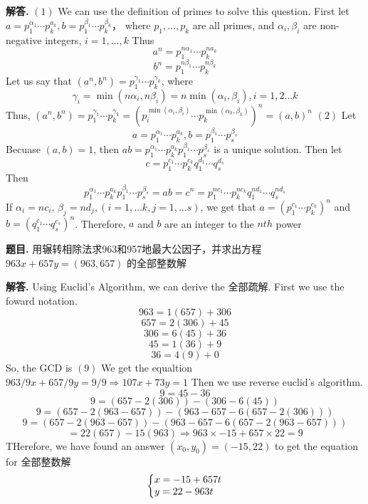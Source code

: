 \documentclass[12pt, a4paper, oneside]{article}
\newcounter{problemname}
\newenvironment{problem}{\begin{shaded}\stepcounter{problemname}\par\noindent\textbf{题目\arabic{problemname}. }}{\end{shaded}\par}
\newenvironment{solution}{\par\noindent\textbf{解答. }}{\par}
\begin{document}
\begin{CJK}{UTF8}{gbsn}
\begin{solution}
    \newline
    $(1)$ We can use the definition of primes to solve this question. First let
    $a = p_1^{\alpha_1}\cdots p_k^{a_k}, b=p_1^{\beta_1} \cdots p_k^{\beta_k} $， where $p_1,\dots,p_k$ are all primes, and 
    $\alpha_i, \beta_i$ are non-negative integers, $i = 1, \dots, k$
    Thus 
    $$ a^n =  p_1^{n\alpha_1}\cdots p_k^{na_k} $$
    $$ b^n=p_1^{n\beta_1} \cdots p_k^{n\beta_k} $$
    Let us say that $(a^n, b^n) = p_1^{\gamma_1}\cdots p_k^{\gamma_k} $, where
    $$ \gamma_i = \min{(n\alpha_i, n\beta_i)} = n\min{(\alpha_i, \beta_i)}, i = 1, 2\dots k $$
    Thus, $(a^n, b^n) = p_1^{\gamma_1}\cdots p_k^{\gamma_k} = (p_i^{\min{(\alpha_i, \beta_i)}}\cdots p_k^{\min{(\alpha_k, \beta_k)}})^n = (a,b)^n$
    \newline
    $(2)$ Let  
    $$a = p_1^{\alpha_1}\cdots p_k^{a_k}, b=p_1^{\beta_1} \cdots p_s^{\beta_s} $$
    Becuase $(a,b) = 1$, then $ab = p_1^{\alpha_1}\cdots p_k^{a_k}p_1^{\beta_1} \cdots p_s^{\beta_s}$ is a unique solution. Then let 
    $$ c = p_1^{c_1}\cdots p_k^{c_k}q_1^{d_1}\cdots q_s^{d_s} $$
    Then
    $$ p_1^{\alpha_1}\cdots p_k^{a_k}p_1^{\beta_1} \cdots p_s^{\beta_s} = ab = c^n = p_1^{nc_1}\cdots p_k^{nc_k}q_1^{nd_1}\cdots q_s^{nd_s}  $$
    If $\alpha_i = nc_i$, $\beta_j = nd_j, (i = 1, \dots k, j=1, \dots s)$, we get that $a=(p_1^{c_1} \cdots p_k^{c_k})^n$ and $b=(q_1^{c_1} \cdots q_s^{c_s})^n$. \newline
    Therefore, $a$ and $b$ are an integer to the $nth$ power
\end{solution}


\setcounter{problemname}{8}
\begin{problem}
    用辗转相除法求963和957地最大公因子，并求出方程$963x + 657y = (963, 657)$ 的全部整数解
\end{problem}

\begin{solution}
    Using Euclid's Algorithm, we can derive the 全部疏解. First we use the foward notation. 
    $$ 963 = 1(657) + 306$$
    $$ 657 = 2(306) + 45 $$
    $$ 306 = 6(45) + 36 $$
    $$ 45 =  1(36) + 9 $$ 
    $$ 36 =  4(9) + 0 $$ 
    So, the GCD is $(9)$ We get the equaltion $963/9x + 657/9y = 9/9 \Rightarrow 107x + 73y = 1$
    Then we use reverse euclid's algorithm. 
    $$ 9 = 45 -36 $$
    $$ 9 = (657 - 2(306)) - (306 - 6(45)) $$ 
    $$ 9 = (657 - 2(963 - 657)) - (963 - 657 - 6(657 - 2(306))) $$
    $$ 9 = (657 - 2(963 - 657)) - (963 - 657 - 6(657 - 2(963 - 657))) $$ 
    $$ = 22(657) - 15(963) \Rightarrow 963 \times -15 + 657 \times 22 = 9$$ 
    THerefore, we have found an answer $(x_0, y_0) = (-15, 22)$ to get the equation for 全部整数解
    $$ \left\{\begin{array}{@{}l@{}}
        x =-15 + 657t\\
        y = 22 - 963t
      \end{array}\right.
    $$ 



\end{solution}
\end{CJK}
\end{document}
